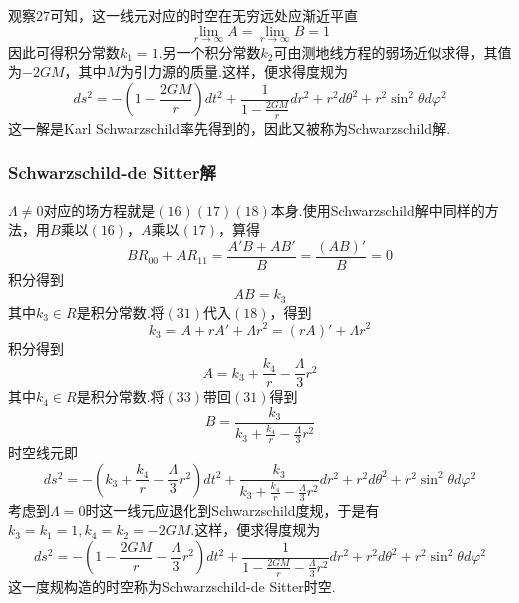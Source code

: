         观察$27$可知，这一线元对应的时空在无穷远处应渐近平直
        \begin{equation}
            {\lim_{r \to \infty}A}={\lim_{r \to \infty}B}=1
        \end{equation}
        因此可得积分常数$k_1=1$.另一个积分常数$k_2$可由测地线方程的弱场近似求得，其值为$-2GM$，其中$M$为引力源的质量.这样，便求得度规为
        \begin{equation}
            ds^2=-\left(1-\frac{2GM}{r}\right)dt^2+\frac{1}{1-\frac{2GM}{r}}dr^2+r^2d\theta^2+r^2\sin^2\theta d\varphi^2
        \end{equation}
        这一解是Karl Schwarzschild率先得到的，因此又被称为Schwarzschild解.
        
        
        
        \subsubsection{Schwarzschild-de Sitter解}
        
        
        
        $\Lambda\ne0$对应的场方程就是$(16)(17)(18)$本身.使用Schwarzschild解中同样的方法，用$B$乘以$(16)$，$A$乘以$(17)$，算得
        \begin{equation}
            BR_{00}+AR_{11}=\frac{A'B+AB'}{B}=\frac{(AB)'}{B}=0
        \end{equation}
        积分得到
        \begin{equation}
            AB=k_3
        \end{equation}
        其中$k_3\in R$是积分常数.将$(31)$代入$(18)$，得到
        \begin{equation}
            k_3=A+rA'+\Lambda r^2=(rA)'+\Lambda r^2
        \end{equation}
        积分得到
        \begin{equation}
            A=k_3+\frac{k_4}{r}-\frac{\Lambda}{3}r^2
        \end{equation}
        其中$k_4\in R$是积分常数.将$(33)$带回$(31)$得到
        \begin{equation}
            B=\frac{k_3}{k_3+\frac{k_4}{r}-\frac{\Lambda}{3}r^2}
        \end{equation}
        时空线元即
        \begin{equation}
            ds^2=-\left(k_3+\frac{k_4}{r}-\frac{\Lambda}{3}r^2\right)dt^2+\frac{k_3}{k_3+\frac{k_4}{r}-\frac{\Lambda}{3}r^2}dr^2+r^2d\theta^2+r^2\sin^2\theta d\varphi^2
        \end{equation}
        考虑到$\Lambda=0$时这一线元应退化到Schwarzschild度规，于是有$k_3=k_1=1,k_4=k_2=-2GM$.这样，便求得度规为
        \begin{equation}
            ds^2=-\left(1-\frac{2GM}{r}-\frac{\Lambda}{3}r^2\right)dt^2+\frac{1}{1-\frac{2GM}{r}-\frac{\Lambda}{3}r^2}dr^2+r^2d\theta^2+r^2\sin^2\theta d\varphi^2
        \end{equation}
        这一度规构造的时空称为Schwarzschild-de Sitter时空.